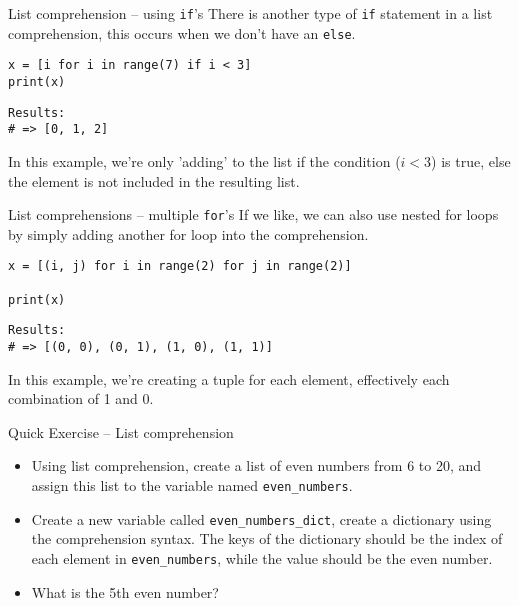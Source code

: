 \documentclass[10pt]{beamer}
\begin{document}
\begin{frame}[label={sec:orgcf7fef6},fragile]{List comprehension -- using \texttt{if}'s}
 There is another type of \texttt{if} statement in a list comprehension, this occurs when we
don't have an \texttt{else}.

\begin{verbatim}
x = [i for i in range(7) if i < 3]
print(x)
\end{verbatim}

\begin{verbatim}
Results: 
# => [0, 1, 2]
\end{verbatim}


In this example, we're only 'adding' to the list if the condition (\(i < 3\)) is true,
else the element is not included in the resulting list.
\end{frame}

\begin{frame}[label={sec:orga2ee4a3},fragile]{List comprehensions -- multiple \texttt{for}'s}
 If we like, we can also use nested for loops by simply adding another for loop into
the comprehension.

\begin{verbatim}
x = [(i, j) for i in range(2) for j in range(2)]

print(x)
\end{verbatim}

\begin{verbatim}
Results: 
# => [(0, 0), (0, 1), (1, 0), (1, 1)]
\end{verbatim}


In this example, we're creating a tuple for each element, effectively each
combination of 1 and 0.
\end{frame}

\begin{frame}[label={sec:org5f9c2a0},fragile]{Quick Exercise -- List comprehension}
 \begin{itemize}
\item Using list comprehension, create a list of even numbers from 6 to 20, and assign
this list to the variable named \texttt{even\_numbers}.
\item Create a new variable called \texttt{even\_numbers\_dict}, create a dictionary using the
comprehension syntax. The keys of the dictionary should be the index of each
element in \texttt{even\_numbers}, while the value should be the even number.
\item What is the 5th even number?
\end{itemize}
\end{frame}
\end{document}
